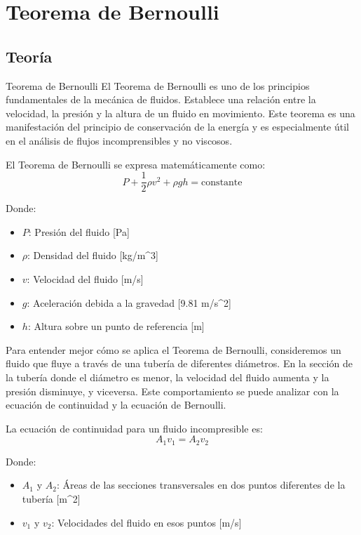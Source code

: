 \documentclass[../main]{subfiles}
\begin{document}
\chapter{Teorema de Bernoulli}
\section{Teoría}

Teorema de Bernoulli
El Teorema de Bernoulli es uno de los principios fundamentales de la mecánica de fluidos. Establece una relación entre la velocidad, la presión y la altura de un fluido en movimiento. Este teorema es una manifestación del principio de conservación de la energía y es especialmente útil en el análisis de flujos incomprensibles y no viscosos.

El Teorema de Bernoulli se expresa matemáticamente como:
\begin{equation}
P + \frac{1}{2} \rho v^2 + \rho g h = \text{constante}
\end{equation}

Donde:
\begin{itemize}
    \item $P$: Presión del fluido [Pa]
    \item $\rho$: Densidad del fluido [kg/m^3]
    \item $v$: Velocidad del fluido [m/s]
    \item $g$: Aceleración debida a la gravedad [9.81 m/s^2]
    \item $h$: Altura sobre un punto de referencia [m]
\end{itemize}

Para entender mejor cómo se aplica el Teorema de Bernoulli, consideremos un fluido que fluye a través de una tubería de diferentes diámetros. En la sección de la tubería donde el diámetro es menor, la velocidad del fluido aumenta y la presión disminuye, y viceversa. Este comportamiento se puede analizar con la ecuación de continuidad y la ecuación de Bernoulli.

La ecuación de continuidad para un fluido incompresible es:
\begin{equation}
A_1 v_1 = A_2 v_2
\end{equation}

Donde:
\begin{itemize}
    \item $A_1$ y $A_2$: Áreas de las secciones transversales en dos puntos diferentes de la tubería [m^2]
    \item $v_1$ y $v_2$: Velocidades del fluido en esos puntos [m/s]
\end{itemize}
\end{document}
